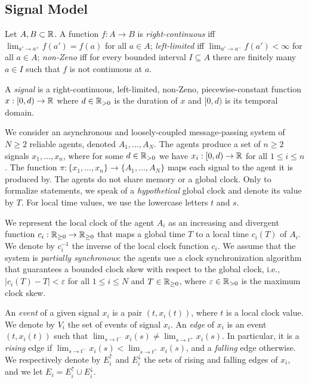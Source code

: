 \subsection{Signal Model}

Let $A,B \subset \mathbb{R}$.
%
A function $f : A \to B$ is
\emph{right-continuous} \; iff \; $\lim_{a' \to a^+} f(a') = f(a)$ for all $a \in A$;
\emph{left-limited} iff $\lim_{a' \to a^-} f(a') < \infty$ for all $a \in A$;
\emph{non-Zeno} iff for every bounded interval $I \subseteq A$ there are finitely many $a \in I$ such that $f$ is not continuous at $a$.

\begin{definition}
	A \emph{signal} is a right-continuous, left-limited, non-Zeno, piecewise-constant function $x : [0,d) \to \mathbb{R}$ where $d \in \mathbb{R}_{> 0}$ is the duration of $x$ and $[0,d)$ is its temporal domain.
\end{definition}

We consider an asynchronous and loosely-coupled message-passing system of $N \geq 2$ reliable 
agents, denoted $A_1, \ldots, A_N$.
%
The agents produce a set of $n \geq 2$ signals $x_1, \ldots, x_n$, where for some $d \in \mathbb{R}_{> 0}$ 
we have $x_i : [0,d) \to \mathbb{R}$ for all $1 \leq i \leq n$.
%
The function $\pi : \{x_1, \ldots, x_n\} \to \{A_1, \ldots, A_N\}$ maps each signal to the agent it is 
produced by. 
%
The agents do not share memory or a global clock.
%
Only to formalize statements, we speak of a {\em hypothetical} global clock and denote its value by 
$T$.
%
For local time values, we use the lowercase letters $t$ and $s$.

We represent the local clock of the agent $A_i$ as an increasing and divergent function $c_i : 
\mathbb{R}_{\geq 0} \to \mathbb{R}_{\geq 0}$ that maps a global time $T$ to a local time $c_i(T)$ of $A_i$.
%
We denote by $c_i^{-1}$ the inverse of the local clock function $c_i$.
%
We assume that the system is \emph{partially synchronous}: the agents use a clock synchronization algorithm that guarantees a bounded clock skew with respect to the global clock, i.e., $|c_i(T) - T| < \varepsilon$ for all $1 \leq i \leq N$ and $T \in \mathbb{R}_{\geq 0}$, where $\varepsilon \in \mathbb{R}_{> 0}$ is the maximum clock skew.



An \emph{event} of a given signal $x_i$ is a pair $(t, x_i(t))$, where $t$ is a local clock value.
We denote by $V_i$ the set of events of signal $x_i$.
%
An \emph{edge} of $x_i$ is an event $(t, x_i(t))$ such that $\lim_{s \to t^-} x_i(s) \neq \lim_{s \to t^+} x_i(s)$.
In particular, it is a \emph{rising} edge if $\lim_{s \to t^-} x_i(s) < \lim_{s \to t^+} x_i(s)$, and a \emph{falling} edge otherwise.
We respectively denote by $E_i^\uparrow$ and $E_i^\downarrow$ the sets of rising and falling edges of $x_i$, and we let $E_i = E_i^\uparrow \cup E_i^\downarrow$.

